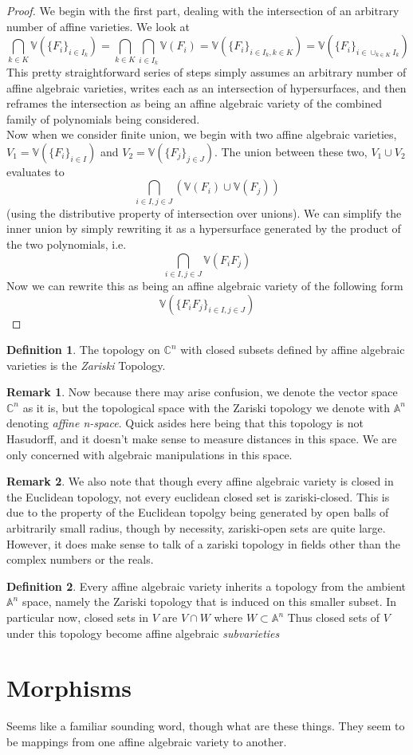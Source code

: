 \documentclass[12pt]{book}
\theoremstyle{definition}
\newtheorem*{defn}{Definition}
\newtheorem*{rem}{Remark}
\begin{document}
\begin{proof}
    We begin with the first part, dealing with the intersection of an arbitrary number of affine varieties. We look at $$\bigcap_{k \in K} \mathbb{V}(\{F_i\}_{i \in I_k}) = \bigcap_{k \in K} \bigcap_{i \in I_k} \mathbb{V}(F_i) = \mathbb{V}(\{F_i\}_{i \in I_k, k \in K}) = \mathbb{V}(\{F_i\}_{i \in \cup_{k \in K} I_k}) $$
    This pretty straightforward series of steps simply assumes an arbitrary number of affine algebraic varieties, writes each as an intersection of hypersurfaces, and then reframes the intersection as being an affine algebraic variety of the combined family of polynomials being considered.\\
    Now when we consider finite union, we begin with two affine algebraic varieties, $V_1 = \mathbb{V}(\{F_i\}_{i \in I})$ and $V_2 = \mathbb{V}(\{F_j\}_{j \in J})$. The union between these two, $V_1 \cup V_2$ evaluates to $$\bigcap_{i \in I, j \in J} (\mathbb{V}(F_i) \cup \mathbb{V}(F_j))$$ (using the distributive property of intersection over unions). We can simplify the inner union by simply rewriting it as a hypersurface generated by the product of the two polynomials, i.e. $$ \bigcap_{i \in I, j \in J} \mathbb{V}(F_iF_j)$$
    Now we can rewrite this as being an affine algebraic variety of the following form $$ \mathbb{V}(\{F_iF_j\}_{i \in I, j \in J})$$ 
\end{proof}

\begin{defn}
    The topology on $\mathbb{C}^n$ with closed subsets defined by affine algebraic varieties is the \textit{Zariski} Topology.
\end{defn}
\begin{rem}
    Now because there may arise confusion, we denote the vector space $\mathbb{C}^n$ as it is, but the topological space with the Zariski topology we denote with $\mathbb{A}^n$ denoting \textit{affine n-space}. Quick asides here being that this topology is not Hasudorff, and it doesn't make sense to measure distances in this space. We are only concerned with algebraic manipulations in this space.
\end{rem}
\begin{rem}
    We also note that though every affine algebraic variety is closed in the Euclidean topology, not every euclidean closed set is zariski-closed. This is due to the property of the Euclidean topolgy being generated by open balls of arbitrarily small radius, though by necessity, zariski-open sets are quite large. However, it does make sense to talk of a zariski topology in fields other than the complex numbers or the reals. 
\end{rem}
\begin{defn}
    Every affine algebraic variety inherits a topology from the ambient $\mathbb{A}^n$ space, namely the Zariski topology that is induced on this smaller subset. In particular now, closed sets in $V$ are $V \cap W$ where $W \subset \mathbb{A}^n$ Thus closed sets of $V$ under this topology become affine algebraic \textit{subvarieties}
\end{defn}

\section{Morphisms}
Seems like a familiar sounding word, though what are these things. They seem to be mappings from one affine algebraic variety to another. 
\end{document}
